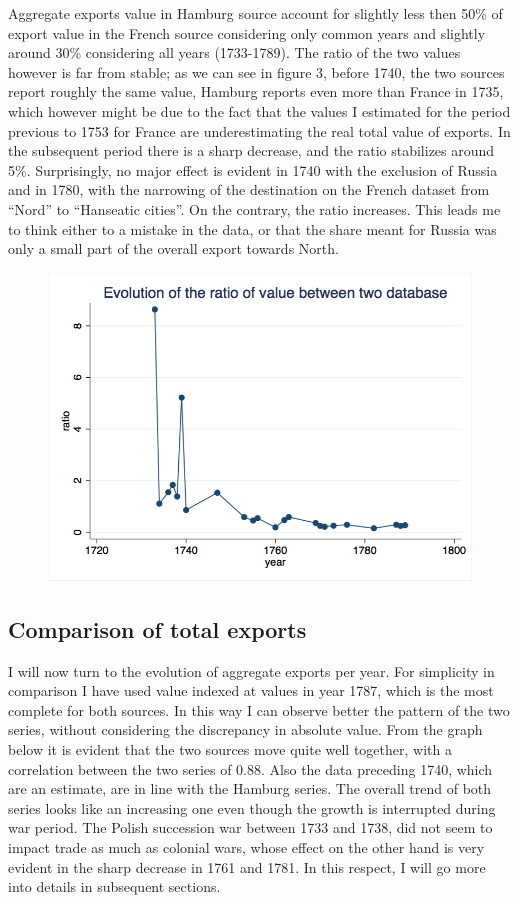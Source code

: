 \documentclass[12pt,a4paper,titlepage,english]{article}
\begin{document}
Aggregate exports value in Hamburg source account for slightly less then 50\% of export value in the French source considering only common years and slightly around 30\% considering all years (1733-1789). The ratio of the two values however is far from stable; as we can see in figure 3, before 1740, the two sources report roughly the same value, Hamburg reports even more than France in 1735, which however might be due to the fact that the values I estimated for the period previous to 1753 for France are underestimating the real total value of exports. In the subsequent period there is a sharp decrease, and the ratio stabilizes around 5\%. Surprisingly, no major effect is evident in 1740 with the exclusion of Russia and in 1780, with the narrowing of the destination on the French dataset from “Nord” to “Hanseatic cities”. On the contrary, the ratio increases. This leads me to think either to a mistake in the data, or that the share meant for Russia was only a small part of the overall export towards North.

\begin{figure}
\centering
{}
\includegraphics[scale=.3]{long_ratio.png}
\end{figure}


\subsection{Comparison of total exports}
I will now turn to the evolution of aggregate exports per year. For simplicity in comparison I have used value indexed at values in year 1787, which is the most complete for both sources. In this way I can observe better  the pattern of the two series, without considering the discrepancy in absolute value. 
From the graph below it is evident that the two sources move quite well together, with a correlation between the two series of 0.88. Also the data preceding 1740, which are an estimate, are in line with the Hamburg series. 
The overall trend of both series looks like an increasing one even though the growth is interrupted during war period. The Polish succession war between 1733 and 1738, did not seem to impact trade as much as colonial wars, whose effect on the other hand is very evident in the sharp decrease in 1761 and 1781. In this respect, I will go more into details in subsequent sections.
\end{document}
